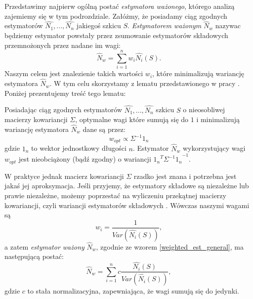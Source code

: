 Przedstawimy najpierw ogólną postać \textit{estymatora ważonego}, którego analizą zajemiemy się w tym podrozdziale. Załóżmy, że posiadamy ciąg zgodnych estymatorów $\hat{N_1}, ..., \hat{N_n}$ jakiegoś szkicu $S$. \textit{Estymatorem ważonym} $\hat{N}_w$ nazywac będziemy estymator powstały przez zsumowanie estymatorów składowych przemnożonych przez nadane im wagi:
\begin{equation}
\label{weighted_est_general}
\hat{N}_w = \sum_{i=1}^{n}w_i\hat{N_i}(S).
\end{equation}
Naszym celem jest znalezienie takich wartości $w_i$, które minimalizują wariancję estymatora $\hat{N}_w$. W tym celu skorzystamy z lematu przedstawionego w pracy \cite{ting}.
Poniżej prezentujemy treść tego lematu:
\begin{lemma}
	 Posiadając ciąg zgodnych estymatorów $\hat{N_1}, ..., \hat{N_n}$ szkicu $S$ o nieosobliwej macierzy kowariancji $\Sigma$, optymalne wagi które sumują się do $1$ i minimalizują wariancję estymatora $\hat{N}_w$ dane są przez:
	 \begin{equation}
	 	w_{opt} \propto  \Sigma^{-1}1_n
	 \end{equation}
	 gdzie $1_n$ to wektor jednostkowy długości $n$. Estymator $\hat{N}_w$ wykorzystujący wagi $w_{opt}$ jest nieobciążony (bądź zgodny) 
	 o wariancji ${{1_n}^{T}\Sigma^{-1}1_n}^{-1}$.
\end{lemma}
W praktyce jednak macierz kowariancji $\Sigma$ rzadko jest znana i potrzebna jest jakaś jej aproksymacja.
Jeśli przyjemy, że estymatory składowe są niezależne
lub prawie niezależne, możemy poprzestać na wyliczeniu przekątnej macierzy kowariancji, czyli wariancji estymatorów składowych \cite{ting}. Wówczas naszymi wagami są $$w_i = \frac{1}{Var(\hat{N_i}(S))},$$ a zatem \textit{estymator ważony} $\hat{N}_w$, zgodnie ze wzorem \ref{weighted_est_general}, ma następującą postać:
\begin{equation}
\label{weighted_est}
    \hat{N}_w = \sum_{i=1}^{n}c\frac{\hat{N_i}(S)}{Var(\hat{N_i}(S))},
\end{equation}
gdzie $c$ to stała normalizacyjna, zapewniająca, że wagi sumują się do jedynki.

